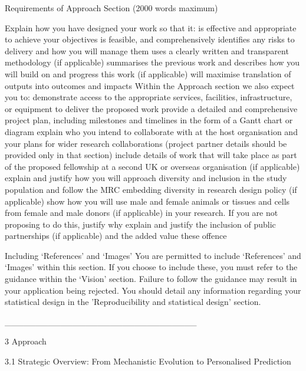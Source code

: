 Requirements of Approach Section (2000 words maximum)

Explain how you have designed your work so that it:
is effective and appropriate to achieve your objectives
is feasible, and comprehensively identifies any risks to delivery and how you will manage them
uses a clearly written and transparent methodology (if applicable)
summarises the previous work and describes how you will build on and progress this work (if applicable)
will maximise translation of outputs into outcomes and impacts
Within the Approach section we also expect you to:
demonstrate access to the appropriate services, facilities, infrastructure, or equipment to deliver the proposed work
provide a detailed and comprehensive project plan, including milestones and timelines in the form of a Gantt chart or diagram
explain who you intend to collaborate with at the host organisation and your plans for wider research collaborations (project partner details should be provided only in that section)
include details of work that will take place as part of the proposed fellowship at a second UK or overseas organisation (if applicable)
explain and justify how you will approach diversity and inclusion in the study population and follow the MRC embedding diversity in research design policy (if applicable)
show how you will use male and female animals or tissues and cells from female and male donors (if applicable) in your research. If you are not proposing to do this, justify why
explain and justify the inclusion of public partnerships (if applicable) and the added value these offence

Including ‘References’ and ‘Images’
You are permitted to include ‘References’ and ‘Images’ within this section. If you choose to include these, you must refer to the guidance within the ‘Vision’ section. Failure to follow the guidance may result in your application being rejected.
You should detail any information regarding your statistical design in the 'Reproducibility and statistical design' section.


_______________________________


3 Approach

3.1 Strategic Overview: From Mechanistic Evolution to Personalised Prediction

